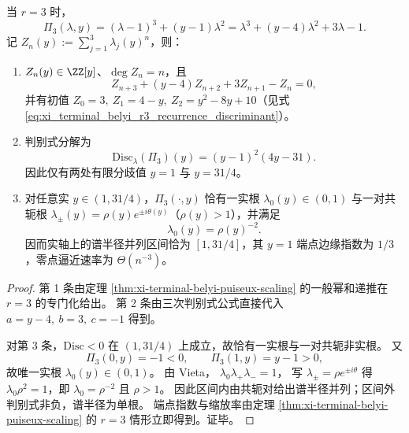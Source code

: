 

\begin{proposition}[\(r=3\) 的显式 Lee--Yang 区间与三次尖点指数]\label{prop:xi-terminal-belyi-r3-explicit-leyang-interval}
当 \(r=3\) 时，
\[
\Pi_3(\lambda,y)=(\lambda-1)^3+(y-1)\lambda^2
=\lambda^3+(y-4)\lambda^2+3\lambda-1.
\]
记 \(Z_n(y):=\sum_{j=1}^{3}\lambda_j(y)^n\)，则：
\begin{enumerate}
  \item \(Z_n(y)\in\ZZ[y]\)、\(\deg Z_n=n\)，且
  \[
  Z_{n+3}+(y-4)Z_{n+2}+3Z_{n+1}-Z_n=0,
  \]
  并有初值
  \(
  Z_0=3,\ Z_1=4-y,\ Z_2=y^2-8y+10
  \)（见式 \eqref{eq:xi_terminal_belyi_r3_recurrence_discriminant}）。
  \item 判别式分解为
  \[
  \mathrm{Disc}_{\lambda}(\Pi_3)(y)=(y-1)^2(4y-31).
  \]
  因此仅有两处有限分歧值 \(y=1\) 与 \(y=31/4\)。
  \item 对任意实 \(y\in(1,31/4)\)，\(\Pi_3(\cdot,y)\) 恰有一实根 \(\lambda_0(y)\in(0,1)\) 与一对共轭根
  \(
  \lambda_\pm(y)=\rho(y)e^{\pm i\theta(y)}
  \)（\(\rho(y)>1\)），并满足
  \[
  \lambda_0(y)=\rho(y)^{-2}.
  \]
  因而实轴上的谱半径并列区间恰为 \([1,31/4]\)，其 \(y=1\) 端点边缘指数为 \(1/3\)，零点逼近速率为 \(\Theta(n^{-3})\)。
\end{enumerate}
\end{proposition}
\begin{proof}
第 1 条由定理 \ref{thm:xi-terminal-belyi-puiseux-scaling} 的一般幂和递推在 \(r=3\) 的专门化给出。
第 2 条由三次判别式公式直接代入
\(
a=y-4,\ b=3,\ c=-1
\)
得到。

对第 3 条，\(\mathrm{Disc}<0\) 在 \((1,31/4)\) 上成立，故恰有一实根与一对共轭非实根。
又
\[
\Pi_3(0,y)=-1<0,\qquad
\Pi_3(1,y)=y-1>0,
\]
故唯一实根 \(\lambda_0(y)\in(0,1)\)。
由 Vieta，
\(
\lambda_0\lambda_+\lambda_-=1
\)，
写 \(\lambda_\pm=\rho e^{\pm i\theta}\) 得
\(
\lambda_0\rho^2=1
\)，即 \(\lambda_0=\rho^{-2}\) 且 \(\rho>1\)。
因此区间内由共轭对给出谱半径并列；区间外判别式非负，谱半径为单根。
端点指数与缩放率由定理 \ref{thm:xi-terminal-belyi-puiseux-scaling} 的 \(r=3\) 情形立即得到。证毕。
\end{proof}

